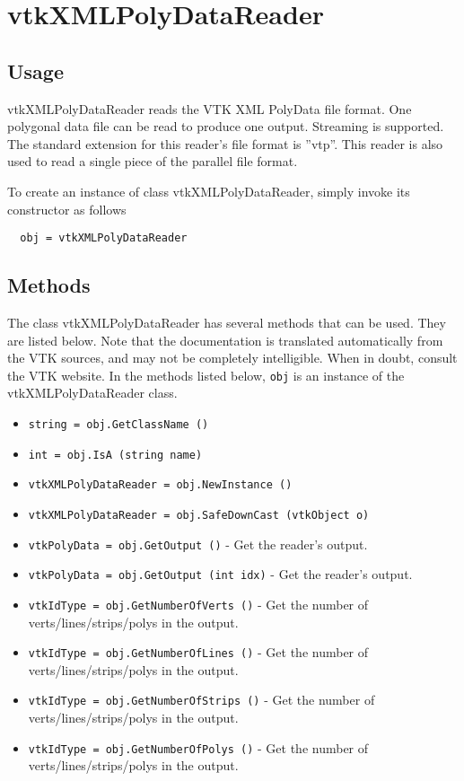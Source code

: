 \section{vtkXMLPolyDataReader}

\subsection{Usage}

 vtkXMLPolyDataReader reads the VTK XML PolyData file format.  One
 polygonal data file can be read to produce one output.  Streaming
 is supported.  The standard extension for this reader's file format
 is ''vtp''.  This reader is also used to read a single piece of the
 parallel file format.

To create an instance of class vtkXMLPolyDataReader, simply
invoke its constructor as follows
\begin{verbatim}
  obj = vtkXMLPolyDataReader
\end{verbatim}
\subsection{Methods}

The class vtkXMLPolyDataReader has several methods that can be used.
  They are listed below.
Note that the documentation is translated automatically from the VTK sources,
and may not be completely intelligible.  When in doubt, consult the VTK website.
In the methods listed below, \verb|obj| is an instance of the vtkXMLPolyDataReader class.
\begin{itemize}
\item  \verb|string = obj.GetClassName ()|

\item  \verb|int = obj.IsA (string name)|

\item  \verb|vtkXMLPolyDataReader = obj.NewInstance ()|

\item  \verb|vtkXMLPolyDataReader = obj.SafeDownCast (vtkObject o)|

\item  \verb|vtkPolyData = obj.GetOutput ()| -  Get the reader's output.

\item  \verb|vtkPolyData = obj.GetOutput (int idx)| -  Get the reader's output.

\item  \verb|vtkIdType = obj.GetNumberOfVerts ()| -  Get the number of verts/lines/strips/polys in the output.

\item  \verb|vtkIdType = obj.GetNumberOfLines ()| -  Get the number of verts/lines/strips/polys in the output.

\item  \verb|vtkIdType = obj.GetNumberOfStrips ()| -  Get the number of verts/lines/strips/polys in the output.

\item  \verb|vtkIdType = obj.GetNumberOfPolys ()| -  Get the number of verts/lines/strips/polys in the output.

\end{itemize}
